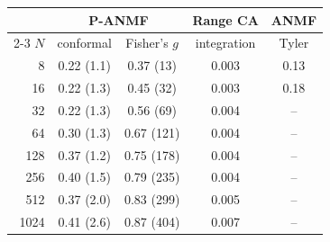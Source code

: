 \begin{tabular}{rcccc}
\toprule
 & \multicolumn{2}{c}{P-ANMF} & Range CA & ANMF\\
\cmidrule(lr){2-3}
$N$ & conformal & Fisher's $g$ & integration & Tyler\\
\midrule
8 & 0.22 (1.1) & 0.37 (13) & 0.003 & 0.13\\
16 & 0.22 (1.3) & 0.45 (32) & 0.003 & 0.18\\
32 & 0.22 (1.3) & 0.56 (69) & 0.004 & --\\
64 & 0.30 (1.3) & 0.67 (121) & 0.004 & --\\
128 & 0.37 (1.2) & 0.75 (178) & 0.004 & --\\
256 & 0.40 (1.5) & 0.79 (235) & 0.004 & --\\
512 & 0.37 (2.0) & 0.83 (299) & 0.005 & --\\
1024 & 0.41 (2.6) & 0.87 (404) & 0.007 & --\\
\bottomrule
\end{tabular}
